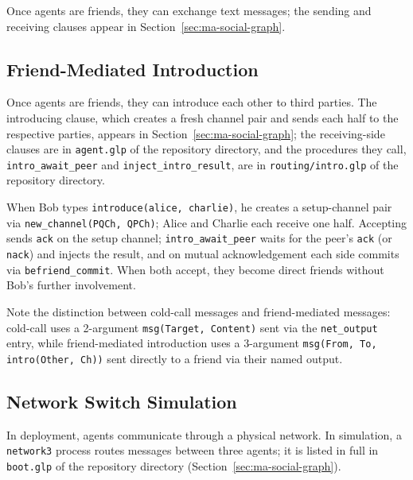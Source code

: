 Once agents are friends, they can exchange text messages; the sending and receiving clauses appear in Section~\ref{sec:ma-social-graph}.





\subsection{Friend-Mediated Introduction}

Once agents are friends, they can introduce each other to third parties. The introducing clause, which creates a fresh channel pair and sends each half to the respective parties, appears in Section~\ref{sec:ma-social-graph}; the receiving-side clauses are in \verb|agent.glp| of the repository directory, and the procedures they call, \verb|intro_await_peer| and \verb|inject_intro_result|, are in \verb|routing/intro.glp| of the repository directory.

When Bob types \verb|introduce(alice, charlie)|, he creates a setup-channel pair via \verb|new_channel(PQCh, QPCh)|; Alice and Charlie each receive one half. Accepting sends \verb|ack| on the setup channel; \verb|intro_await_peer| waits for the peer's \verb|ack| (or \verb|nack|) and injects the result, and on mutual acknowledgement each side commits via \verb|befriend_commit|. When both accept, they become direct friends without Bob's further involvement.

Note the distinction between cold-call messages and friend-mediated messages: cold-call uses a 2-argument \verb|msg(Target, Content)| sent via the \verb|net_output| entry, while friend-mediated introduction uses a 3-argument \verb|msg(From, To, intro(Other, Ch))| sent directly to a friend via their named output.

\subsection{Network Switch Simulation}

In deployment, agents communicate through a physical network. In simulation, a \verb|network3| process routes messages between three agents; it is listed in full in \verb|boot.glp| of the repository directory (Section~\ref{sec:ma-social-graph}).


